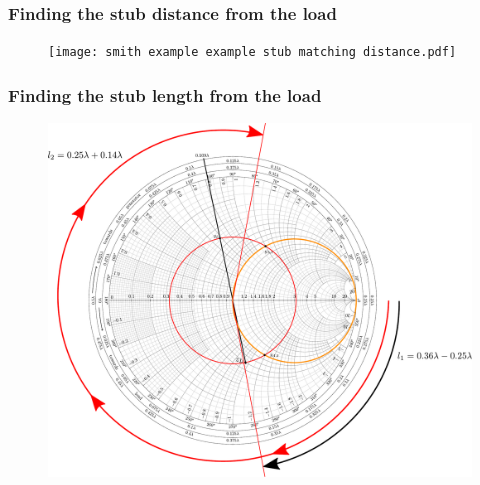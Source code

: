 \documentclass[10pt, compress]{beamer}
\begin{document}
\begin{frame}
    \frametitle{Finding the stub distance from the load}
    \begin{figure}[]
        \centering
        \texttt{[image: smith  example example stub matching distance.pdf]}
    \end{figure}
\end{frame}


\begin{frame}
    \frametitle{Finding the stub length from the load}
    \begin{figure}[]
        \centering
        \includegraphics[width=.8\textwidth]{smith example example stub length.pdf}
    \end{figure}
\end{frame}
\end{document}

